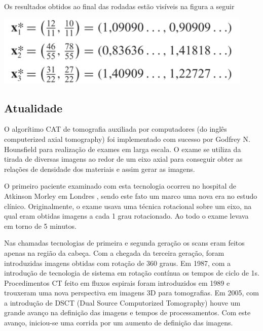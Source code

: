\documentclass[a4paper, 12pt]{article}
\begin{document}
Os resultados obtidos ao final das rodadas estão visíveis na figura a seguir

\includegraphics{x estrela.png}

    
\subsection {Atualidade}   
O algorítimo CAT de tomografia auxiliada por computadores (do inglês computerized axial tomography) foi implementado com sucesso por Godfrey N. Hounsfield para realização de exames em larga escala. O exame se utiliza da tirada de diversas imagens ao redor de um eixo axial para conseguir obter as relações de densidade dos materiais e assim gerar as imagens.

O primeiro paciente examinado com esta tecnologia ocorreu no hospital de Atkinson Morley em Londres \citep{lell2015evolution}, sendo este fato um marco uma nova era no estudo clínico. Originalmente, o exame usava uma técnica rotacional sobre um eixo, na qual eram obtidas imagens a cada 1 grau rotacionado. Ao todo o exame levava em torno de 5 minutos.

Nas chamadas tecnologias de primeira e segunda geração \citep{lell2015evolution}
os scans eram feitos apenas na região da cabeça. Com a chegada da terceira geração, foram introduzidas imagens obtidas com rotação de 360 graus. Em 1987, com a introdução de tecnologia de sistema em rotação contínua os tempos de ciclo de 1s. Procedimentos CT feito em fluxos espirais foram introduzidos em 1989 e trouxeram uma nova perspectiva em imagens 3D para tomografias. Em 2005, com a introdução de DSCT (Dual Source Computorized Tomography) houve um grande avanço na definição das imagens e tempos de processamentos. Com este avanço, iniciou-se uma corrida por um aumento de definição das imagens.
\end{document}
